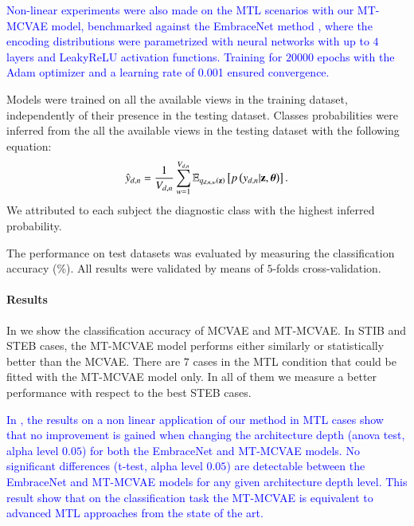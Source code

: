 \textcolor{blue}{
	Non-linear experiments were also made on the MTL scenarios with our MT-MCVAE model, benchmarked against the EmbraceNet method \citep{embracenet}, where the encoding distributions were parametrized with neural networks with up to $4$ layers and LeakyReLU activation functions.
	Training for $20000$ epochs with the Adam optimizer and a learning rate of 0.001 ensured convergence.
}

Models were trained on all the available views in the training dataset, independently of their presence in the testing dataset.
Classes probabilities were inferred from the all the available views in the testing dataset with the following equation:
\begin{equation}\label{eq:reconstructiony}
\begin{aligned}
\hat{y}_{d,n} = \frac{1}{V_{d, n}} \sum_{w=1}^{V_{d, n}} \operatorname{\mathbb{E}}_{q_{d,n,w}(\mathbf{z})}\left[p\left(y_{d,n}|\mathbf{z},\boldsymbol{\theta}\right)\right].
\end{aligned}
\end{equation}
We attributed to each subject the diagnostic class with the highest inferred probability.

The performance on test datasets was evaluated by measuring the classification accuracy (\%).
All results were validated by means of $5$-folds cross-validation.

\paragraph{Results}
In  we show the classification accuracy of MCVAE and MT-MCVAE.
In STIB and STEB cases, the MT-MCVAE model performs either similarly or statistically better than the MCVAE.
There are $7$ cases in the MTL condition  that could be fitted with the MT-MCVAE model only.
In all of them we measure a better performance with respect to the best STEB cases.

\textcolor{blue}{
	In , the results on a non linear application of our method in MTL cases show
	that no improvement is gained when changing the architecture depth (anova test, alpha level $0.05$) for both the EmbraceNet and MT-MCVAE models.
	No significant differences (t-test, alpha level $0.05$) are detectable between the EmbraceNet and MT-MCVAE models for any given architecture depth level.
	This result show that on the classification task the MT-MCVAE is equivalent to advanced MTL approaches from the state of the art.
}

